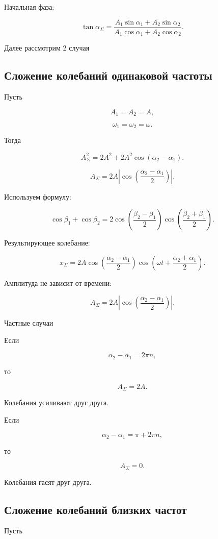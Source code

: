 \documentclass[a4paper,12pt]{article}
\begin{document}
Начальная фаза:

\[
\tan \alpha_{\Sigma}
=
\frac{
A_1 \sin \alpha_1 + A_2 \sin \alpha_2
}{
A_1 \cos \alpha_1 + A_2 \cos \alpha_2
}.
\]

Далее рассмотрим 2 случая 

\subsection*{Сложение колебаний одинаковой частоты}

Пусть

\[
A_1 = A_2 = A,
\]

\[
\omega_1 = \omega_2 = \omega.
\]

Тогда

\[
A_{\Sigma}^2
=
2A^2 + 2A^2 \cos(\alpha_2 - \alpha_1).
\]

\[
A_{\Sigma}
=
2A
\left|
\cos\left(
\frac{\alpha_2 - \alpha_1}{2}
\right)
\right|.
\]

Используем формулу:

\[
\cos \beta_1 + \cos \beta_2
=
2 \cos\left(
\frac{\beta_2 - \beta_1}{2}
\right)
\cos\left(
\frac{\beta_2 + \beta_1}{2}
\right).
\]

Результирующее колебание:

\[
x_{\Sigma}
=
2A
\cos\left(
\frac{\alpha_2 - \alpha_1}{2}
\right)
\cos\left(
\omega t + \frac{\alpha_2 + \alpha_1}{2}
\right).
\]

Амплитуда не зависит от времени:

\[
A_{\Sigma}
=
2A
\left|
\cos\left(
\frac{\alpha_2 - \alpha_1}{2}
\right)
\right|.
\]

Частные случаи

Если

\[
\alpha_2 - \alpha_1 = 2\pi n,
\]

то

\[
A_{\Sigma} = 2A.
\]

Колебания усиливают друг друга.

Если

\[
\alpha_2 - \alpha_1 = \pi + 2\pi n,
\]

то

\[
A_{\Sigma} = 0.
\]

Колебания гасят друг друга.

\subsection*{Сложение колебаний близких частот}

Пусть
\end{document}
